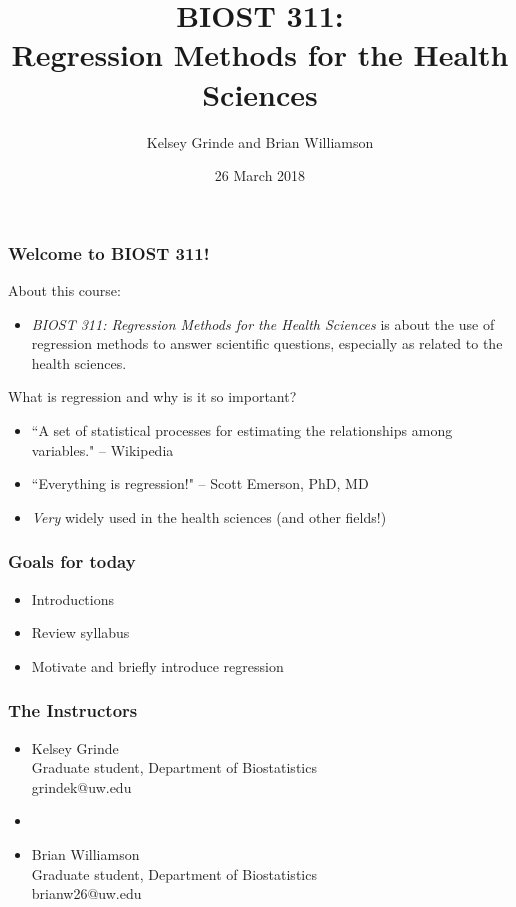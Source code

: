\documentclass[12pt, 
hyperref={colorlinks=true, linkcolor=blue, urlcolor=cyan}]{beamer}
\title{BIOST 311: \\ Regression Methods for the Health Sciences}
\author{Kelsey Grinde and Brian Williamson}
\institute{UW Biostatistics}
\date{26 March 2018}
\begin{document}
\begin{frame}
\titlepage\thispagestyle{empty}
\end{frame}


\setcounter{framenumber}{\value{day1}}

\begin{frame}
\frametitle{Welcome to BIOST 311!}

About this course:
\begin{itemize}
\item[] \textit{BIOST 311: Regression Methods for the Health Sciences} is about the use of regression methods to answer scientific questions, especially as related to the health sciences.
\end{itemize}

What is regression and why is it so important?
\begin{itemize}
\item ``A set of statistical processes for estimating the relationships among variables." -- Wikipedia
\item ``Everything is regression!" -- Scott Emerson, PhD, MD
\item \textit{Very} widely used in the health sciences (and other fields!)
\end{itemize}

\end{frame}

\begin{frame}
\frametitle{Goals for today}

\begin{itemize}
\item Introductions
\item Review syllabus
\item Motivate and briefly introduce regression
\end{itemize}

\end{frame}

\begin{frame}
\frametitle{The Instructors}
\begin{itemize}
\item[] Kelsey Grinde \\ Graduate student, Department of Biostatistics \\ grindek@uw.edu 
\item[]
\item[] Brian Williamson \\ Graduate student, Department of Biostatistics \\ brianw26@uw.edu
\end{itemize}
\end{frame}
\end{document}
